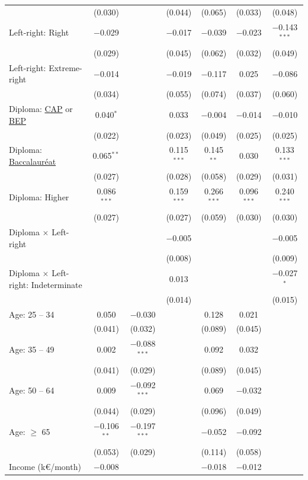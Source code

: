 \documentclass[english,5p,authoryear]{elsarticle}
\begin{document}
\begin{table}[!htbp]
{\begin{tabular}{@{\extracolsep{5pt}}lcccccc}
  & (0.030) &  & (0.044) & (0.065) & (0.033) & (0.048) \\ 
  Left-right: Right & $-$0.029 &  & $-$0.017 & $-$0.039 & $-$0.023 & $-$0.143$^{***}$ \\ 
  & (0.029) &  & (0.045) & (0.062) & (0.032) & (0.049) \\ 
  Left-right: Extreme-right & $-$0.014 &  & $-$0.019 & $-$0.117 & 0.025 & $-$0.086 \\ 
  & (0.034) &  & (0.055) & (0.074) & (0.037) & (0.060) \\ 
  Diploma: \uline{CAP} or \uline{BEP} & 0.040$^{*}$ &  & 0.033 & $-$0.004 & $-$0.014 & $-$0.010 \\ 
  & (0.022) &  & (0.023) & (0.049) & (0.025) & (0.025) \\ 
  Diploma: \uline{Baccalauréat} & 0.065$^{**}$ &  & 0.115$^{***}$ & 0.145$^{**}$ & 0.030 & 0.133$^{***}$ \\ 
  & (0.027) &  & (0.028) & (0.058) & (0.029) & (0.031) \\ 
  Diploma: Higher & 0.086$^{***}$ &  & 0.159$^{***}$ & 0.266$^{***}$ & 0.096$^{***}$ & 0.240$^{***}$ \\ 
  & (0.027) &  & (0.027) & (0.059) & (0.030) & (0.030) \\ 
  Diploma $\times$ Left-right &  &  & $-$0.005 &  &  & $-$0.005 \\ 
  &  &  & (0.008) &  &  & (0.009) \\ 
  Diploma $\times$ Left-right: Indeterminate &  &  & 0.013 &  &  & $-$0.027$^{*}$ \\ 
  &  &  & (0.014) &  &  & (0.015) \\ 
  Age: 25 -- 34 & 0.050 & $-$0.030 &  & 0.128 & 0.021 &  \\ 
  & (0.041) & (0.032) &  & (0.089) & (0.045) &  \\ 
  Age: 35 -- 49 & 0.002 & $-$0.088$^{***}$ &  & 0.092 & 0.032 &  \\ 
  & (0.041) & (0.029) &  & (0.089) & (0.045) &  \\ 
  Age: 50 -- 64 & 0.009 & $-$0.092$^{***}$ &  & 0.069 & $-$0.032 &  \\ 
  & (0.044) & (0.029) &  & (0.096) & (0.049) &  \\ 
  Age: $\geq$ 65 & $-$0.106$^{**}$ & $-$0.197$^{***}$ &  & $-$0.052 & $-$0.092 &  \\ 
  & (0.053) & (0.029) &  & (0.114) & (0.058) &  \\ 
  Income (k\euro{}/month) & $-$0.008 &  &  & $-$0.018 & $-$0.012 &  \\ 

\end{tabular}}
\end{table}
\end{document}
